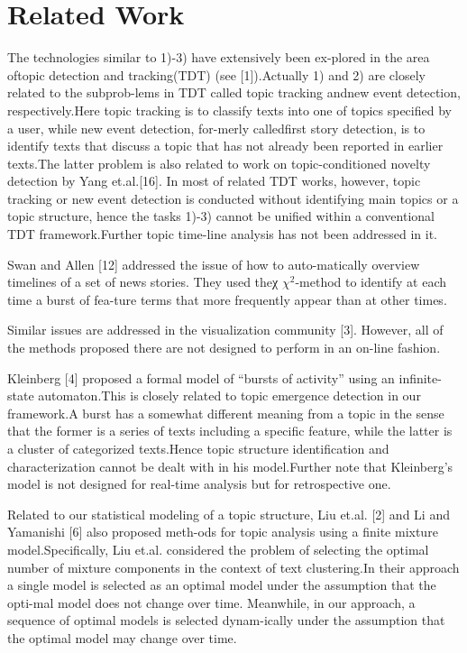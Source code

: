 \section{Related Work}
\label{sec:related}

The technologies similar to 1)-3) have extensively been ex-plored in the area oftopic detection and tracking(TDT) (see [1]).Actually 1) and 2) are closely related to the subprob-lems in TDT called topic tracking andnew event detection, respectively.Here topic tracking is to classify texts into one of topics specified by a user, while new event detection, for-merly calledfirst story detection, is to identify texts that discuss a topic that has not already been reported in earlier texts.The latter problem is also related to work on topic-conditioned novelty detection by Yang et.al.[16]. In most of related TDT works, however, topic tracking or new event detection is conducted without identifying main topics or a topic structure, hence the tasks 1)-3) cannot be unified within a conventional TDT framework.Further topic time-line analysis has not been addressed in it.

Swan and Allen [12] addressed the issue of how to auto-matically overview timelines of a set of news stories. They used theχ $\chi^2$-method to identify at each time a burst of fea-ture terms that more frequently appear than at other times.

Similar issues are addressed in the visualization community [3]. However, all of the methods proposed there are not designed to perform in an on-line fashion.

Kleinberg [4] proposed a formal model of “bursts of activity” using an infinite-state automaton.This is closely related to topic emergence detection in our framework.A
burst has a somewhat different meaning from a topic in the sense that the former is a series of texts including a specific feature, while the latter is a cluster of categorized
texts.Hence topic structure identification and characterization cannot be dealt with in his model.Further note that Kleinberg’s model is not designed for real-time analysis but
for retrospective one.

Related to our statistical modeling of a topic structure, Liu et.al. [2] and Li and Yamanishi [6] also proposed meth-ods for topic analysis using a finite mixture model.Specifically, Liu et.al. considered the problem of selecting the optimal number of mixture components in the context of text clustering.In their approach a single model is selected as an optimal model under the assumption that the opti-mal model does not change over time. Meanwhile, in our approach, a sequence of optimal models is selected dynam-ically under the assumption that the optimal model may change over time.

